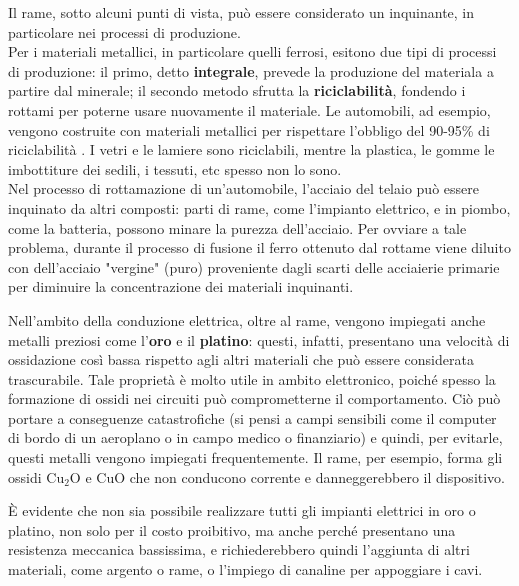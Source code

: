 Il rame, sotto alcuni punti di vista, può essere considerato un inquinante, in particolare nei processi di produzione. \\
Per i materiali metallici, in particolare quelli ferrosi, esitono due tipi di processi di produzione: il primo, detto \textbf{integrale}, prevede la produzione del materiala a partire dal minerale; il secondo metodo sfrutta la \textbf{riciclabilità}, fondendo i rottami per poterne usare nuovamente il materiale. Le automobili, ad esempio, vengono costruite con materiali metallici per rispettare l'obbligo del 90-95\% di riciclabilità . I vetri e le lamiere sono riciclabili, mentre la plastica, le gomme le imbottiture dei sedili, i tessuti, etc spesso non lo sono. \\
Nel processo di rottamazione di un'automobile, l'acciaio del telaio può essere inquinato da altri composti: parti di rame, come l'impianto elettrico, e in piombo, come la batteria, possono minare la purezza dell'acciaio. Per ovviare a tale problema, durante il processo di fusione il ferro ottenuto dal rottame viene diluito con dell'acciaio "vergine" (puro) proveniente dagli scarti delle acciaierie primarie per diminuire la concentrazione dei materiali inquinanti.

Nell'ambito della conduzione elettrica, oltre al rame, vengono impiegati anche metalli preziosi come l'\textbf{oro} e il \textbf{platino}: questi, infatti, presentano una velocità di ossidazione così bassa rispetto agli altri materiali che può essere considerata trascurabile. Tale proprietà è molto utile in ambito elettronico, poiché spesso la formazione di ossidi nei circuiti può comprometterne il comportamento. Ciò può portare a conseguenze catastrofiche (si pensi a campi sensibili come il computer di bordo di un aeroplano o in campo medico o finanziario) e quindi, per evitarle, questi metalli vengono impiegati frequentemente. Il rame, per esempio, forma gli ossidi $\mathrm{Cu_2O}$ e $\mathrm{CuO}$ che non conducono corrente e danneggerebbero il dispositivo.

È evidente che non sia possibile realizzare tutti gli impianti elettrici in oro o platino, non solo per il costo proibitivo, ma anche perché presentano una resistenza meccanica bassissima, e richiederebbero quindi l'aggiunta di altri materiali, come argento o rame, o l'impiego di canaline per appoggiare i cavi.

